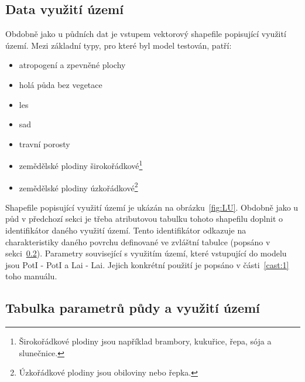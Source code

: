  
 
 
 
 
 
 
 
 
 
 
\subsection{Data využití území} \label{sec:vstupvegetace}
Obdobně jako u půdních dat je vstupem vektorový shapefile popisující využití území. Mezi základní typy, pro které byl model testován, patří:
\begin{itemize} \itemsep -3pt
  \item atropogení a zpevněné plochy  
  \item holá půda bez vegetace
  \item les
  \item sad
  \item travní porosty
  \item zemědělské plodiny širokořádkové\footnote{Širokořádkové plodiny jsou například brambory, kukuřice, řepa, sója a slunečnice.}
  \item zemědělské plodiny úzkořádkové\footnote{Úzkořádkové plodiny jsou obiloviny nebo řepka.}
\end{itemize}


Shapefile popisující využití území je ukázán na obrázku~\ref{fig:LU}. Obdobně jako u půd v předchozí sekci je třeba atributovou tabulku tohoto shapefilu doplnit o identifikátor daného využití území. Tento identifikátor odkazuje na charakteristiky daného povrchu definované ve zvláštní tabulce (popsáno v sekci~\ref{sec:upravatabulkyparametru}). Parametry související s využitím území, které vstupující do modelu jsou \acs{PotI} - \acl{PotI} a \acs{Lai} - \acl{Lai}. Jejich konkrétní použití je popsáno v části~\ref{cast:1} toho manuálu. 
% 
% 
% 
% 















\subsection{Tabulka parametrů půdy a využití území}  \label{sec:upravatabulkyparametru}

